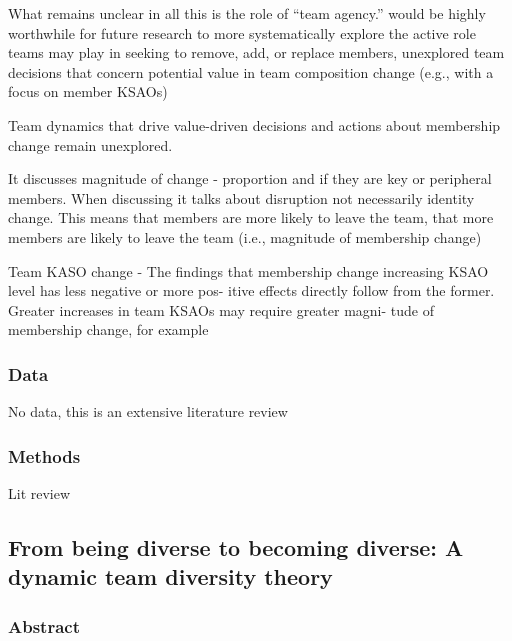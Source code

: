 \documentclass[12pt]{article}
\begin{document}
What remains unclear in all this is the role of “team agency.”  would be highly worthwhile for future research to more systematically explore the active role teams may play in seeking to remove, add, or replace members, unexplored team decisions that concern potential value in team composition change (e.g., with a focus on member KSAOs)

Team dynamics that drive value-driven decisions and actions about membership change remain unexplored.

It discusses magnitude of change - proportion and if they are key or peripheral members. When discussing it talks about disruption not necessarily identity change. This means that members are more likely to leave the team, that more members are likely to leave the team (i.e., magnitude of membership change)

Team KASO change - The findings that membership change increasing KSAO level has less negative or more pos- itive effects directly follow from the former. Greater increases in team KSAOs may require greater magni- tude of membership change, for example


\subsubsection*{Data}

No data, this is an extensive literature review



\subsubsection*{Methods}

Lit review

\subsection*{From being diverse to becoming diverse: A dynamic team diversity theory\cite{diverse_to_becoming_diverse}}

\subsubsection*{Abstract}
\end{document}
